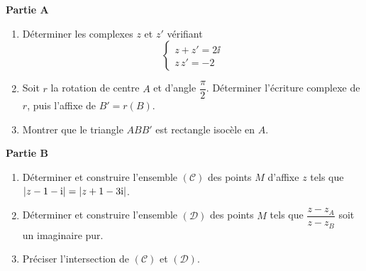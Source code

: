 \textbf{Partie A}
\begin{enumerate}
	\item Déterminer les complexes $z$ et $z'$ vérifiant
	$$
	\begin{cases}
		z + z' = 2\ii \\
		z\,z' = -2
	\end{cases}
	$$
	\item Soit $r$ la rotation de centre $A$ et d'angle $\dfrac{\pi}{2}$.
	Déterminer l'écriture complexe de $r$, puis l'affixe de $B' = r(B)$.
	\item Montrer que le triangle $ABB'$ est rectangle isocèle en $A$.
\end{enumerate}

\textbf{Partie B}
\begin{enumerate}
	\item Déterminer et construire l'ensemble $(\mathscr{C})$ des points $M$
	d'affixe $z$ tels que $\left|z - 1 - \mathrm{i}\right| = \left|z + 1 - 3\mathrm{i}\right|$.
	\item Déterminer et construire l'ensemble $(\mathscr{D})$ des points $M$
	tels que $\dfrac{z - z_A}{z - z_B}$ soit un imaginaire pur.
	\item Préciser l'intersection de $(\mathscr{C})$ et $(\mathscr{D})$.
\end{enumerate}
